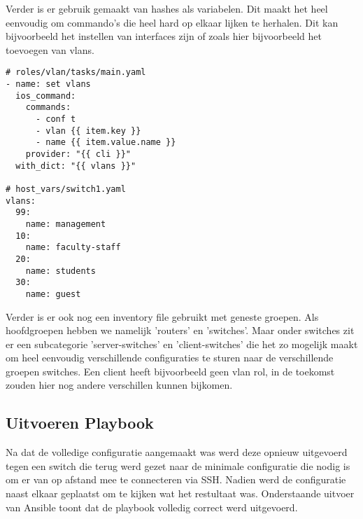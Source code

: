 Verder is er gebruik gemaakt van hashes als variabelen. Dit maakt het heel eenvoudig om commando's die heel hard op elkaar lijken te herhalen. Dit kan bijvoorbeeld het instellen van interfaces zijn of zoals hier bijvoorbeeld het toevoegen van vlans.

\begin{verbatim}
# roles/vlan/tasks/main.yaml
- name: set vlans
  ios_command:
    commands:
      - conf t
      - vlan {{ item.key }}
      - name {{ item.value.name }}
    provider: "{{ cli }}"
  with_dict: "{{ vlans }}"
  
# host_vars/switch1.yaml
vlans:
  99:
    name: management
  10:
    name: faculty-staff
  20:
    name: students
  30:
    name: guest
\end{verbatim}

Verder is er ook nog een inventory file gebruikt met geneste groepen. Als hoofdgroepen hebben we namelijk 'routers' en 'switches'. Maar onder switches zit er een subcategorie 'server-switches' en 'client-switches' die het zo mogelijk maakt om heel eenvoudig verschillende configuraties te sturen naar de verschillende groepen switches. Een client heeft bijvoorbeeld geen vlan rol, in de toekomst zouden hier nog andere verschillen kunnen bijkomen.

\subsection{Uitvoeren Playbook}
\label{ch:ansibleplaybookexecution}

Na dat de volledige configuratie aangemaakt was werd deze opnieuw uitgevoerd tegen een switch die terug werd gezet naar de minimale configuratie die nodig is om er van op afstand mee te connecteren via SSH. Nadien werd de configuratie naast elkaar geplaatst om te kijken wat het restultaat was. Onderstaande uitvoer van Ansible toont dat de playbook volledig correct werd uitgevoerd.

